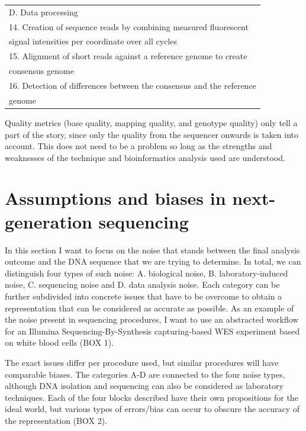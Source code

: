 \begin{table}[H]
\begin{minipage}{\textwidth}
\begin{tabular}{!{\color{deeporange}\VRule[3pt]}l!{\color{deeporange}\VRule[3pt]}}
			\\
			\setrow{\bfseries}D. Data processing \\
			14.	Creation of sequence reads by combining measured fluorescent \\ signal intensities per coordinate over all cycles \\
			15.	Alignment of short reads against a reference genome to create \\ consensus genome \\
			16.	Detection of differences between the consensus and the reference  \\ genome \\
			\hline
		\end{tabular}
	\end{minipage}
\end{table}

\noindent Quality metrics (base quality, mapping quality, and genotype quality) only tell a part of the story, since only the quality from the sequencer onwards is taken into account. 
This does not need to be a problem so long as the strengths and weaknesses of the technique and bioinformatics analysis used are understood. 

\section{Assumptions and biases in next-generation \newline sequencing} \label{Assumptions and biases in next-generation sequencing}
In this section I want to focus on the noise that stands between the final analysis outcome and the DNA sequence that we are trying to determine. 
In total, we can distinguish four types of such noise: A. biological noise, B. laboratory-induced noise, C. sequencing noise and D. data analysis noise. 
Each category can be further subdivided into concrete issues that have to be overcome to obtain a representation that can be considered as accurate as possible. 
As an example of the noise present in sequencing procedures, I want to use an abstracted workflow for an Illumina Sequencing-By-Synthesis capturing-based WES experiment based on white blood cells (BOX 1). 


The exact issues differ per procedure used, but similar procedures will have comparable biases. The categories A-D are connected to the four noise types, although DNA isolation and sequencing can also be considered as laboratory techniques. 
Each of the four blocks described have their own propositions for the ideal world, but various types of errors/bias can occur to obscure the accuracy of the representation (BOX 2). 

